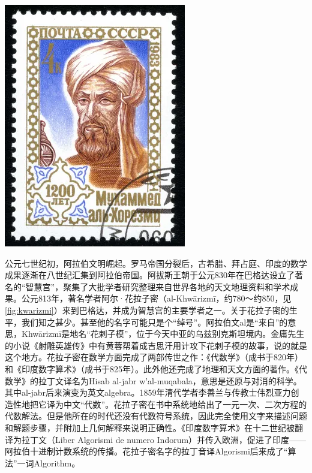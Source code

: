 \documentclass[b5paper]{article}
\begin{document}
\begin{mdframed}

\begin{center}
 \includegraphics[scale=0.3]{img/Khwarizmi}
 \label{fig:kwarizmi}
\end{center}

 \label{sec:Khwarizmi}
公元七世纪初，阿拉伯文明崛起。罗马帝国分裂后，古希腊、拜占庭、印度的数学成果逐渐在八世纪汇集到阿拉伯帝国。阿拔斯王朝于公元830年在巴格达设立了著名的“智慧宫”，聚集了大批学者研究整理来自世界各地的天文地理资料和学术成果。公元813年，著名学者阿尔·花拉子密（al-Khwārizmī，约780～约850，见\cref{fig:kwarizmi}）来到巴格达，并成为智慧宫的主要学者之一。关于花拉子密的生平，我们知之甚少。甚至他的名字可能只是个“绰号”。阿拉伯文al是“来自”的意思，Khwārizmī是地名“花剌子模”，位于今天中亚的乌兹别克斯坦境内。金庸先生的小说《射雕英雄传》中有黄蓉帮着成吉思汗用计攻下花剌子模的故事，说的就是这个地方。花拉子密在数学方面完成了两部传世之作：《代数学》（成书于820年）和《印度数字算术》（成书于825年）。此外他还完成了地理和天文方面的著作。《代数学》的拉丁文译名为Hisab al-jabr w'al-muqabala，意思是还原与对消的科学。其中al-jabr后来演变为英文algebra。1859年清代学者李善兰与传教士伟烈亚力创造性地把它译为中文“代数”\cite{HanXueTao2009}。花拉子密在书中系统地给出了一元一次、二次方程的代数解法。但是他所在的时代还没有代数符号系统，因此完全使用文字来描述问题和解题步骤，并附加上几何解释来说明正确性。《印度数字算术》在十二世纪被翻译为拉丁文（Liber Algorismi de numero Indorum）并传入欧洲，促进了印度——阿拉伯十进制计数系统的传播。花拉子密名字的拉丁音译Algorismi后来成了“算法”一词Algorithm\cite{Britannica-25}。

\end{mdframed}
\end{document}
